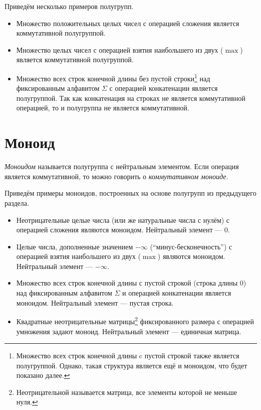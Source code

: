 \begin{example} Приведём несколько примеров полугрупп.
\begin{itemize}
	\item Множество положительных целых чисел с операцией сложения является коммутативной полугруппой.
	\item Множество целых чисел с операцией взятия наибольшего из двух ($\max$) является коммутативной полугруппой.
	\item Множество всех строк конечной длины без пустой строки\footnote{Множество всех строк конечной длины c пустой строкой также является полугруппой. Однако, такая структура является ещё и моноидом, что будет показано далее.} над фиксированным алфавитом $\Sigma$ с операцией конкатенации является полугруппой. Так как конкатенация на строках не является коммутативной операцией, то и полугруппа не является коммутативной.
\end{itemize}
\end{example}


\section{Моноид}


\begin{definition}
	\emph{Моноидом} называется полугруппа с нейтральным элементом. Если операция является коммутативной, то можно говорить о \emph{коммутативном моноиде}.
\end{definition}

\begin{example} Приведём примеры моноидов, построенных на основе полугрупп из предыдущего раздела.

\begin{itemize}
	\item Неотрицательные целые числа (или же натуральные числа с нулём) с операцией сложения являются моноидом. Нейтральный элемент --- $0$.
	\item Целые числа, дополненные значением $-\infty$ (``минус-бесконечность'') с операцией взятия наибольшего из двух ($\max$) являются моноидом. Нейтральный элемент --- $-\infty$.
	\item Множество всех строк конечной длины с пустой строкой (строка длины 0) над фиксированным алфавитом $\Sigma$ и операцией конкатенации является моноидом. Нейтральный элемент --- пустая строка.
	\item Квадратные неотрицательные матрицы\footnote{Неотрицательной называется матрица, все элементы которой не меньше нуля.} фиксированного размера с операцией умножения задают моноид. Нейтральный элемент --- единичная матрица.
\end{itemize}
\end{example}


